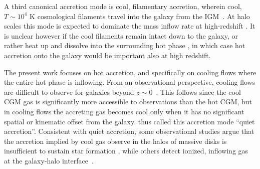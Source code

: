 \documentclass[fleqn,usenatbib]{mnras}
\begin{document}
A third canonical accretion mode is cool, filamentary accretion, wherein cool, $T \sim 10^4$ K cosmological filaments travel into the galaxy from the IGM~\cite[e.g.][]{Keres2005, Dekel2006, Keres2009, Martin2019a}. At halo scales this mode is expected to dominate the mass inflow rate at high-redshift \citep[$z\gtrsim2$, e.g.][]{Keres2009a, Dekel2009, Huscher2020}. It is unclear however if the cool filaments remain intact down to the galaxy, or rather heat up and dissolve into the surrounding hot phase \citep{Nelson2016, Mandelker+}, in which case hot accretion onto the galaxy would be important also at high redshift. 



The present work focuses on hot accretion, and specifically on cooling flows where the entire hot phase is inflowing.  
From an observational perspective, cooling flows are difficult to observe for galaxies beyond
$z\sim0$~\citep{Putman2012}.
This follows since the cool CGM gas is significantly more accessible to observations than the hot CGM, but in cooling flows the accreting gas becomes cool only when it has no significant spatial or kinematic offset from the galaxy.
\citeauthor{Putman2012} thus called this accretion mode ``quiet accretion''. 
Consistent with quiet accretion, some observational studies argue that the accretion implied by cool gas observe in the halos of massive disks is insufficient to sustain star formation \citep{Binney09}, while others detect ionized, inflowing gas at the galaxy-halo interface~\citep{Zheng2017}. 

\end{document}
